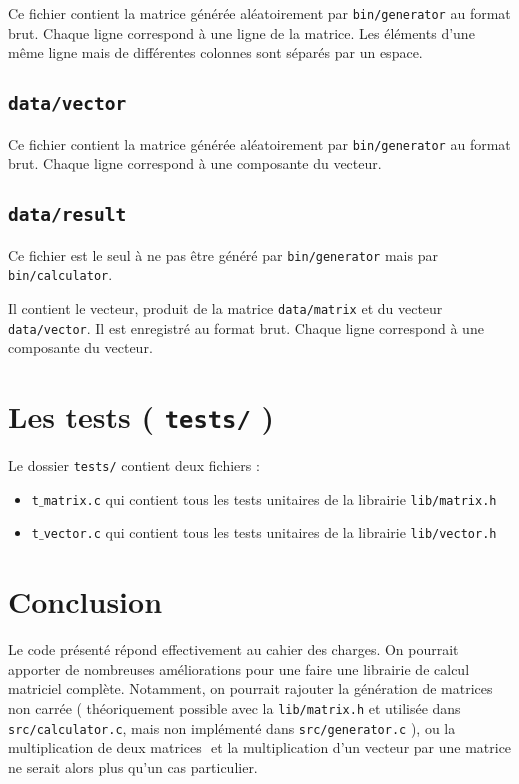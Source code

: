 \documentclass[a4paper,10pt]{article}
\begin{document}
Ce fichier contient la matrice générée aléatoirement par \texttt{bin/generator} au format brut. Chaque ligne correspond à une ligne de la matrice. Les éléments d'une même ligne mais de différentes colonnes sont séparés par un espace.

\subsection{\texttt{data/vector}}

Ce fichier contient la matrice générée aléatoirement par \texttt{bin/generator} au format brut. Chaque ligne correspond à une composante du vecteur.

\subsection{\texttt{data/result}}

Ce fichier est le seul à ne pas être généré par \texttt{bin/generator} mais par \texttt{bin/calculator}. 

\bigskip

Il contient le vecteur, produit de la matrice \texttt{data/matrix} et du vecteur \texttt{data/vector}. Il est enregistré au format brut. Chaque ligne correspond à une composante du vecteur.

\section{Les tests ( \texttt{tests/} )}

Le dossier \texttt{tests/} contient deux fichiers :
\medskip
\begin{itemize}
  \item \texttt{t$\_$matrix.c} qui contient tous les tests unitaires de la librairie \texttt{lib/matrix.h}
  \item \texttt{t$\_$vector.c} qui contient tous les tests unitaires de la librairie \texttt{lib/vector.h}
\end{itemize}

\vspace{2cm}

\section{Conclusion}

Le code présenté répond effectivement au cahier des charges. On pourrait apporter de nombreuses améliorations pour une faire une librairie de calcul matriciel complète. Notamment, on pourrait rajouter la génération de matrices non carrée ( théoriquement possible avec la \texttt{lib/matrix.h} et utilisée dans \texttt{src/calculator.c}, mais non implémenté dans \texttt{src/generator.c} ), ou la multiplication de deux matrices \textemdash $ $ et la multiplication d'un vecteur par une matrice ne serait alors plus qu'un cas particulier.
\end{document}
